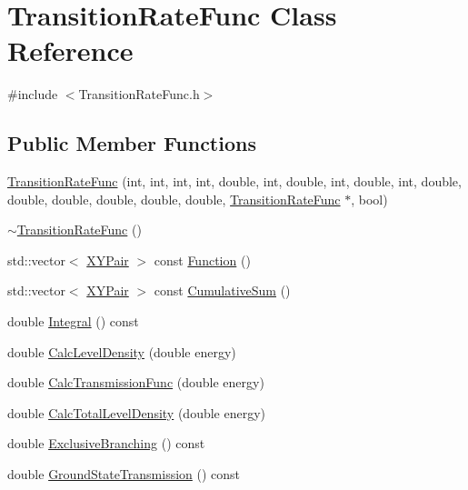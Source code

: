\hypertarget{classTransitionRateFunc}{\section{Transition\-Rate\-Func Class Reference}
\label{classTransitionRateFunc}
}


{\ttfamily \#include $<$Transition\-Rate\-Func.\-h$>$}

\subsection*{Public Member Functions}
\begin{DoxyCompactItemize}
\item 
\hyperlink{classTransitionRateFunc_a358f40612d3c99b3891ea6b12986e731}{Transition\-Rate\-Func} (int, int, int, int, double, int, double, int, double, int, double, double, double, double, double, double, \hyperlink{classTransitionRateFunc}{Transition\-Rate\-Func} $\ast$, bool)
\item 
\hyperlink{classTransitionRateFunc_a8984bc603b33b245fe2a5a5329a3f67e}{$\sim$\-Transition\-Rate\-Func} ()
\item 
std\-::vector$<$ \hyperlink{classXYPair}{X\-Y\-Pair} $>$ const \hyperlink{classTransitionRateFunc_a4b9a309e9288c531912f9a2b424b6826}{Function} ()
\item 
std\-::vector$<$ \hyperlink{classXYPair}{X\-Y\-Pair} $>$ const \hyperlink{classTransitionRateFunc_a8403001845549cae39aa5c344fd97838}{Cumulative\-Sum} ()
\item 
double \hyperlink{classTransitionRateFunc_ac2e8e5c86c01bf2f0198d4c50c9272f9}{Integral} () const 
\item 
double \hyperlink{classTransitionRateFunc_a2131d16208035803f34bbf966d995fe1}{Calc\-Level\-Density} (double energy)
\item 
double \hyperlink{classTransitionRateFunc_acea0c4d2dbfe1a31bfb4ea5d2720e6b4}{Calc\-Transmission\-Func} (double energy)
\item 
double \hyperlink{classTransitionRateFunc_a03d1a328b3183d2eadb48d05b9d63597}{Calc\-Total\-Level\-Density} (double energy)
\item 
double \hyperlink{classTransitionRateFunc_aa75253d5839cd84ab00bdceaf8ca2e9d}{Exclusive\-Branching} () const 
\item 
double \hyperlink{classTransitionRateFunc_a9632cdbf1551e2b52cc7af595e1e3b65}{Ground\-State\-Transmission} () const 
\end{DoxyCompactItemize}
